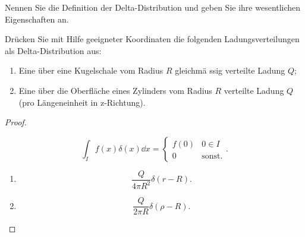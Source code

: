 \begin{Problem}
	\begin{parts}
	\item Nennen Sie die Definition der Delta-Distribution und geben Sie ihre wesentlichen Eigenschaften an.
	\item Drücken Sie mit Hilfe geeigneter Koordinaten die folgenden Ladungsverteilungen als Delta-Distribution aus:
		\begin{enumerate}[label=(\arabic*)]
			\item  Eine über eine Kugelschale vom Radius $R$ gleichmä ssig verteilte Ladung $Q$; 
			\item Eine über die Oberfläche eines Zylinders vom Radius $R$ verteilte Ladung $Q$ (pro Längeneinheit in z-Richtung). 
		\end{enumerate}
	\end{parts}
\end{Problem}

\begin{proof}
	\begin{parts}
	\item \[
		\int_I f(x)\delta(x)\dd{x}=\begin{cases}
			f(0) & 0\in I\\
			0 & \text{sonst.}
		\end{cases}
	.\] 
\item 
	\begin{enumerate}[label=(\arabic*)]
		\item \[
		\frac{Q}{4\pi R^2}\delta(r-R)
		.\] 
	\item \[
	\frac{Q}{2\pi R}\delta(\rho - R)
	.\] 
	\end{enumerate}
	\end{parts}
\end{proof}

